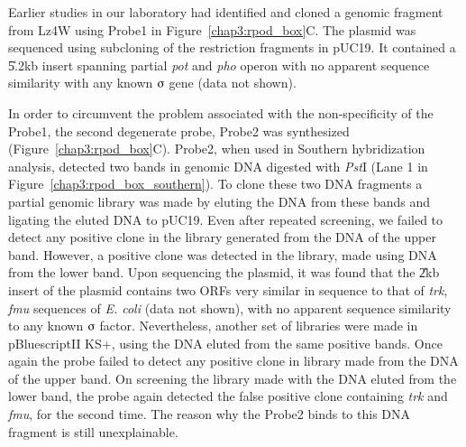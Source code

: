 Earlier studies in our laboratory had identified and cloned a
genomic fragment from Lz4W using Probe1 in
Figure~\ref{chap3:rpod_box}C. The plasmid was sequenced using
subcloning of the restriction fragments in pUC19. It contained a
\U{5.2}{kb} insert spanning partial \emph{pot} and \emph{pho}
operon with no apparent sequence similarity with any known
$\sigmaup$ gene (data not shown).

In order to circumvent the problem associated with the
non-specificity of the Probe1, the second degenerate probe, Probe2
was synthesized (Figure~\ref{chap3:rpod_box}C). Probe2, when used
in Southern hybridization analysis, detected two bands in genomic
DNA digested with \emph{Pst}I (Lane 1 in
Figure~\ref{chap3:rpod_box_southern}). To clone these two DNA
fragments a  partial genomic library was made by eluting the DNA
from these bands and ligating the eluted DNA to pUC19. Even after
repeated screening, we failed to detect any positive clone in the
library generated from the DNA of the upper band. However, a
positive clone was detected in the library, made using DNA from
the lower band. Upon sequencing the plasmid, it was found that the
\U{2}{kb} insert of the plasmid contains two ORFs very similar in
sequence to that of \emph{trk}, \emph{fmu} sequences of \emph{E.
coli} (data not shown), with no apparent sequence similarity to
any known $\sigmaup$ factor. Nevertheless, another set of
libraries were made in pBluescriptII KS+, using the DNA eluted
from the same positive bands. Once again the probe failed to
detect any positive clone in library made from the DNA of the
upper band. On screening the library made with the DNA eluted from
the lower band, the probe again detected the false positive clone
containing \emph{trk} and \emph{fmu}, for the second time. The
reason why the Probe2 binds to this DNA fragment is still
unexplainable.

